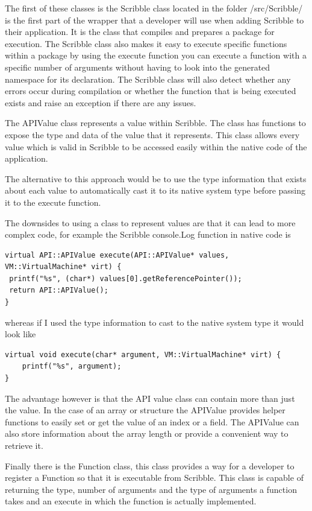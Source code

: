 \documentclass[]{final_report}
\begin{document}
The first of these classes is the Scribble class located in the folder /src/Scribble/ is the first part of the wrapper that a developer will use when adding Scribble to their application. It is the class that compiles and prepares a package for execution. The Scribble class also makes it easy to execute specific functions within a package by using the execute function you can execute a function with a specific number of arguments without having to look into the generated namespace for its declaration. The Scribble class will also detect whether any errors occur during compilation or whether the function that is being executed exists and raise an exception if there are any issues.

The APIValue class represents a value within Scribble. The class has functions to expose the type and data of the value that it represents. This class allows every value which is valid in Scribble to be accessed easily within the native code of the application.

The alternative to this approach would be to use the type information that exists about each value to automatically cast it to its native system type before passing it to the execute function.

The downsides to using a class to represent values are that it can lead to more complex code, for example the Scribble console.Log function in native code is 

\begin{verbatim}
virtual API::APIValue execute(API::APIValue* values, VM::VirtualMachine* virt) {
 printf("%s", (char*) values[0].getReferencePointer());
 return API::APIValue();
}
\end{verbatim}

whereas if I used the type information to cast to the native system type it would look like

\begin{verbatim}
virtual void execute(char* argument, VM::VirtualMachine* virt) {
	printf("%s", argument);
}
\end{verbatim}

The advantage however is that the API value class can contain more than just the value. In the case of an array or structure the APIValue provides helper functions to easily set or get the value of an index or a field. The APIValue can also store information about the array length or provide a convenient way to retrieve it.

Finally there is the Function class, this class provides a way for a developer to register a Function so that it is executable from Scribble. This class is capable of returning the type, number of arguments and the type of arguments a function takes and an execute in which the function is actually implemented.
\end{document}
